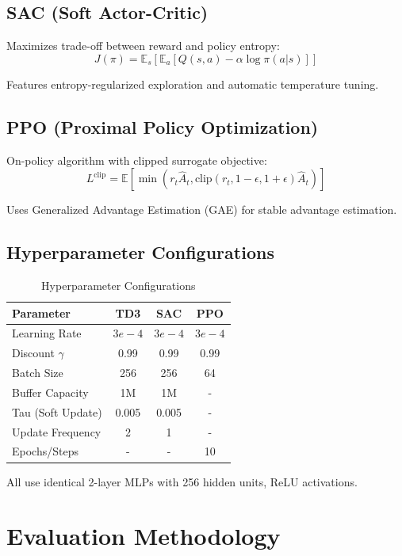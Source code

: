 \documentclass[10pt,a4paper,twocolumn]{article}
\begin{document}
\subsection{SAC (Soft Actor-Critic)}

Maximizes trade-off between reward and policy entropy:
\[
J(\pi) = \mathbb{E}_s[\mathbb{E}_a[Q(s,a) - \alpha \log \pi(a|s)]]
\]

Features entropy-regularized exploration and automatic temperature tuning.

\subsection{PPO (Proximal Policy Optimization)}

On-policy algorithm with clipped surrogate objective:
\[
L^{\text{clip}} = \mathbb{E}[\min(r_t \hat{A}_t, \text{clip}(r_t, 1-\epsilon, 1+\epsilon) \hat{A}_t)]
\]

Uses Generalized Advantage Estimation (GAE) for stable advantage estimation.

\subsection{Hyperparameter Configurations}

\begin{table}[H]
\centering\small
\begin{tabular}{lccc}
\toprule
\textbf{Parameter} & \textbf{TD3} & \textbf{SAC} & \textbf{PPO} \\
\midrule
Learning Rate & $3e-4$ & $3e-4$ & $3e-4$ \\
Discount $\gamma$ & 0.99 & 0.99 & 0.99 \\
Batch Size & 256 & 256 & 64 \\
Buffer Capacity & 1M & 1M & - \\
Tau (Soft Update) & 0.005 & 0.005 & - \\
Update Frequency & 2 & 1 & - \\
Epochs/Steps & - & - & 10 \\
\bottomrule
\end{tabular}
\caption{Hyperparameter Configurations}
\label{tab:hp}
\end{table}

All use identical 2-layer MLPs with 256 hidden units, ReLU activations.

\section{Evaluation Methodology}
\end{document}
